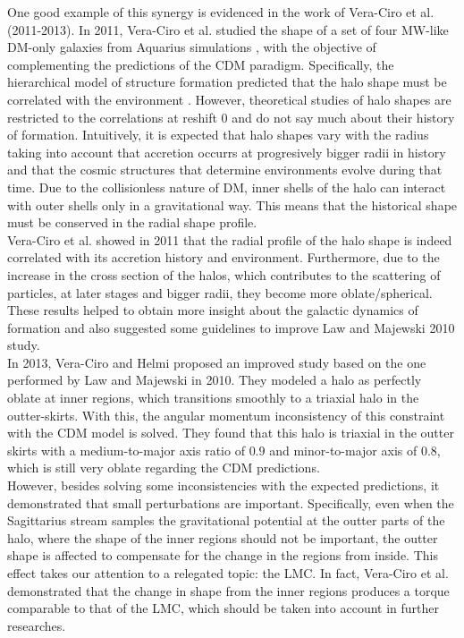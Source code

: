 One good example of this synergy is evidenced in the work of Vera-Ciro et al. (2011-2013). In 2011, Vera-Ciro et al. studied the shape of a set of four MW-like DM-only galaxies from Aquarius simulations \cite{aquarius}, with the objective of complementing the predictions of the CDM paradigm. Specifically, the hierarchical model of structure formation predicted that the halo shape must be correlated with the environment \cite{Tormen_et_al._1997,Colberg_et_al._1999}. However, theoretical studies of halo shapes are restricted to the correlations at reshift 0 and do not say much about their history of formation. Intuitively, it is expected that halo shapes vary with the radius taking into account that accretion occurrs at progresively bigger radii in history and that the cosmic structures that determine environments evolve during that time. Due to the collisionless nature of DM, inner shells of the halo can interact with outer shells only in a gravitational way. This means that the historical shape must be conserved in the radial shape profile.\\

Vera-Ciro et al.  showed in 2011 that the radial profile of the halo shape is indeed correlated with its accretion history and environment. Furthermore, due to the increase in the cross section of the halos, which contributes to the scattering of particles, at later stages and bigger radii, they become more oblate/spherical. These results helped to obtain more insight about the galactic dynamics of formation and also suggested some guidelines to improve Law and Majewski 2010 study.\\

In 2013, Vera-Ciro and Helmi proposed an improved study based on the one performed by Law and Majewski in 2010. They modeled a halo as perfectly oblate at inner regions, which transitions smoothly to a triaxial halo in the outter-skirts. With this, the angular momentum inconsistency of this constraint with the CDM model is solved. They found that this halo is triaxial in the outter skirts with a medium-to-major axis ratio of $0.9$ and minor-to-major axis of $0.8$, which is still very oblate regarding the CDM predictions.\\

However, besides solving some inconsistencies with the expected predictions, it demonstrated that small perturbations are important. Specifically, even when the Sagittarius stream samples the gravitational potential at the outter parts of the halo, where the shape of the inner regions should not be important, the outter shape is affected to compensate for the change in the regions from inside. This effect takes our attention to a relegated topic: the LMC. In fact, Vera-Ciro et al. demonstrated that the change in shape from the inner regions produces a torque comparable to that of the LMC, which should be taken into account in further researches.\\

